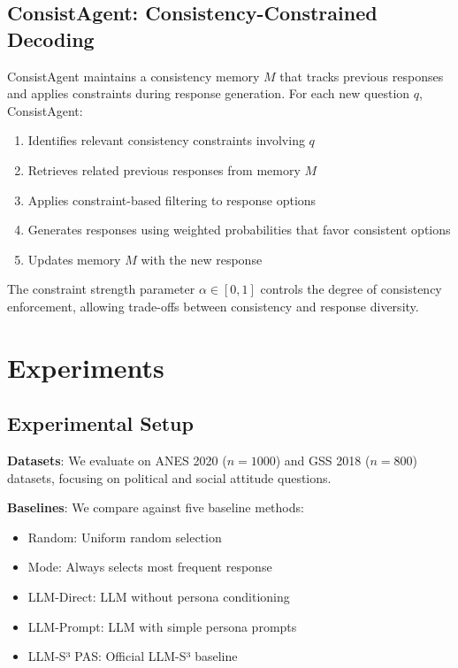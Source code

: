 \documentclass[sigconf, anonymous]{acmart}
\begin{document}
\subsection{ConsistAgent: Consistency-Constrained Decoding}

ConsistAgent maintains a consistency memory $M$ that tracks previous responses and applies constraints during response generation. For each new question $q$, ConsistAgent:

\begin{enumerate}
    \item Identifies relevant consistency constraints involving $q$
    \item Retrieves related previous responses from memory $M$
    \item Applies constraint-based filtering to response options
    \item Generates responses using weighted probabilities that favor consistent options
    \item Updates memory $M$ with the new response
\end{enumerate}

The constraint strength parameter $\alpha \in [0,1]$ controls the degree of consistency enforcement, allowing trade-offs between consistency and response diversity.

\section{Experiments}

\subsection{Experimental Setup}

\textbf{Datasets}: We evaluate on ANES 2020 ($n=1000$) and GSS 2018 ($n=800$) datasets, focusing on political and social attitude questions.

\textbf{Baselines}: We compare against five baseline methods:
\begin{itemize}
    \item Random: Uniform random selection
    \item Mode: Always selects most frequent response
    \item LLM-Direct: LLM without persona conditioning
    \item LLM-Prompt: LLM with simple persona prompts
    \item LLM-S³ PAS: Official LLM-S³ baseline
\end{itemize}
\end{document}
